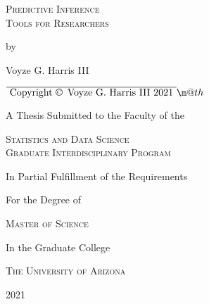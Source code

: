 \documentclass[12pt,a4paper]{report}
\makeatletter
\newcommand*{\textoverline}[1]{$\overline{\hbox{#1}}\m@th$}
\makeatother
\begin{document}

\begin{titlepage}
	\centering
	{\scshape\LARGE Predictive Inference\\Tools for Researchers \par}
	\vspace{1cm}
	by\par
	\vspace{1cm}
	{\Large Voyze G. Harris III\par}
	\vspace{1cm}
	\textoverline{  Copyright \copyright \, Voyze G. Harris III 2021  }\\
	\vspace{1cm}
	{\Large A Thesis Submitted to the Faculty of the\par}
	\vspace{1cm}
	{\scshape\LARGE Statistics and Data Science\\Graduate Interdisciplinary Program\par}
  \vspace{1cm}
	{\Large In Partial Fulfillment of the Requirements\par}
	{\Large For the Degree of\par}
	\vspace{1cm}
	{\scshape\LARGE Master of Science\par}
	\vspace{1cm}
	{\Large In the Graduate College\par}
	\vspace{1cm}
	{\scshape\LARGE The University of Arizona\par}
	\vspace{1cm}
	{\Large 2021\par}



	\vfill

\end{titlepage}
\end{document}
